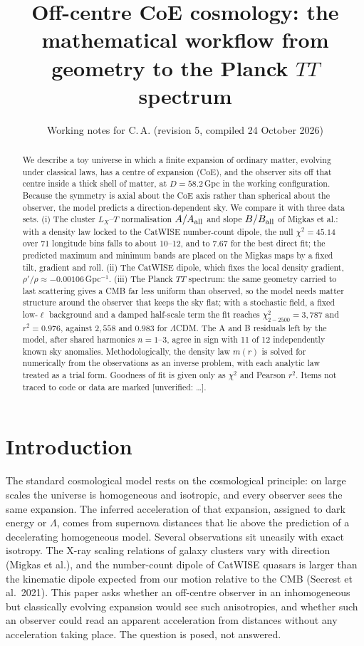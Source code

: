 \documentclass[10pt,twocolumn]{article}
\title{Off-centre CoE cosmology: the mathematical workflow from geometry to the Planck $TT$ spectrum}
\author{Working notes for C.\,A. \quad (revision 5, compiled 24 October 2026)}
\date{}
\newcommand{\flag}[1]{\textsf{[unverified: #1]}}
\begin{document}
\maketitle
\begin{abstract}
\noindent We describe a toy universe in which a finite expansion of ordinary matter, evolving under classical laws, has a centre of expansion (CoE), and the observer sits off that centre inside a thick shell of matter, at $D=58.2$\,Gpc in the working configuration. Because the symmetry is axial about the CoE axis rather than spherical about the observer, the model predicts a direction-dependent sky. We compare it with three data sets. (i) The cluster $L_X$--$T$ normalisation $A/A_{\rm all}$ and slope $B/B_{\rm all}$ of Migkas et al.: with a density law locked to the CatWISE number-count dipole, the null $\chi^2=45.14$ over 71 longitude bins falls to about 10--12, and to 7.67 for the best direct fit; the predicted maximum and minimum bands are placed on the Migkas maps by a fixed tilt, gradient and roll. (ii) The CatWISE dipole, which fixes the local density gradient, $\rho'/\rho\approx-0.00106$\,Gpc$^{-1}$. (iii) The Planck $TT$ spectrum: the same geometry carried to last scattering gives a CMB far less uniform than observed, so the model needs matter structure around the observer that keeps the sky flat; with a stochastic field, a fixed low-$\ell$ background and a damped half-scale term the fit reaches $\chi^2_{2-2500}=3{,}787$ and $r^2=0.976$, against $2{,}558$ and $0.983$ for $\Lambda$CDM. The A and B residuals left by the model, after shared harmonics $n=1$--3, agree in sign with 11 of 12 independently known sky anomalies. Methodologically, the density law $m(r)$ is solved for numerically from the observations as an inverse problem, with each analytic law treated as a trial form. Goodness of fit is given only as $\chi^2$ and Pearson $r^2$. Items not traced to code or data are marked \flag{\ldots}.
\end{abstract}

\section{Introduction}\label{sec:intro}
The standard cosmological model rests on the cosmological principle: on large scales the universe is homogeneous and isotropic, and every observer sees the same expansion. The inferred acceleration of that expansion, assigned to dark energy or $\Lambda$, comes from supernova distances that lie above the prediction of a decelerating homogeneous model. Several observations sit uneasily with exact isotropy. The X-ray scaling relations of galaxy clusters vary with direction (Migkas et al.), and the number-count dipole of CatWISE quasars is larger than the kinematic dipole expected from our motion relative to the CMB (Secrest et al.\ 2021). This paper asks whether an off-centre observer in an inhomogeneous but classically evolving expansion would see such anisotropies, and whether such an observer could read an apparent acceleration from distances without any acceleration taking place. The question is posed, not answered.
\end{document}
